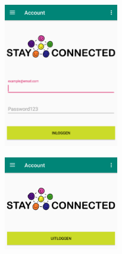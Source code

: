 \documentclass[dutch]{report}
\begin{document}
	\begin{minipage}{0.50\textwidth}
		\begin{center}
			\includegraphics[width=5cm]{images/inloggen.png}		
		\end{center}
	\end{minipage}
	\hfill
	\begin{minipage}{0.50\textwidth}
		\begin{center}
			\includegraphics[width=5cm]{images/uitloggen.png}
		\end{center}
	\end{minipage}
	
	
\end{document}
